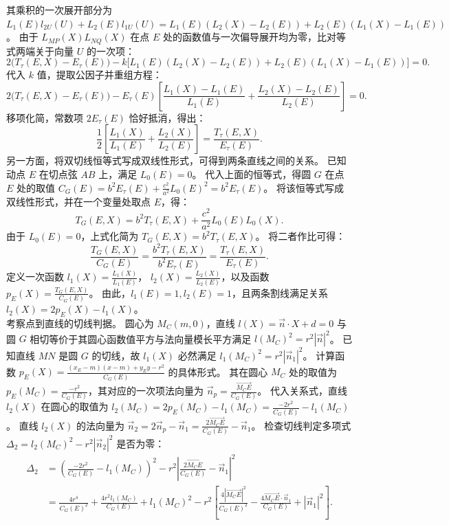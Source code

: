 \begin{solution}
其乘积的一次展开部分为 $L_1(E) l_{2U}(U) + L_2(E) l_{1U}(U) = L_1(E) (L_2(X) - L_2(E)) + L_2(E) (L_1(X) - L_1(E))$。
由于 $L_{MP}(X) L_{NQ}(X)$ 在点 $E$ 处的函数值与一次偏导展开均为零，比对等式两端关于向量 $U$ 的一次项：
\[ 2\big(T_\tau(E, X) - E_\tau(E)\big) - k \big[ L_1(E) (L_2(X) - L_2(E)) + L_2(E) (L_1(X) - L_1(E)) \big] = 0. \]
代入 $k$ 值，提取公因子并重组方程：
\[ 2\big(T_\tau(E, X) - E_\tau(E)\big) - E_\tau(E) \left[ \frac{L_1(X) - L_1(E)}{L_1(E)} + \frac{L_2(X) - L_2(E)}{L_2(E)} \right] = 0. \]
移项化简，常数项 $2E_\tau(E)$ 恰好抵消，得出：
\[ \frac{1}{2} \left[ \frac{L_1(X)}{L_1(E)} + \frac{L_2(X)}{L_2(E)} \right] = \frac{T_\tau(E, X)}{E_\tau(E)}. \]
另一方面，将双切线恒等式写成双线性形式，可得到两条直线之间的关系。
已知动点 $E$ 在切点弦 $AB$ 上，满足 $L_0(E) = 0$。
代入上面的恒等式，得圆 $G$ 在点 $E$ 处的取值 $C_G(E) = b^2 E_\tau(E) + \frac{c^2}{a^2}L_0(E)^2 = b^2 E_\tau(E)$。
将该恒等式写成双线性形式，并在一个变量处取点 $E$，得：
\[ T_G(E, X) = b^2 T_\tau(E, X) + \frac{c^2}{a^2} L_0(E) L_0(X). \]
由于 $L_0(E) = 0$，上式化简为 $T_G(E, X) = b^2 T_\tau(E, X)$。
将二者作比可得：
\[ \frac{T_G(E, X)}{C_G(E)} = \frac{b^2 T_\tau(E, X)}{b^2 E_\tau(E)} = \frac{T_\tau(E, X)}{E_\tau(E)}. \]
定义一次函数 $l_1(X) = \frac{L_1(X)}{L_1(E)}$， $l_2(X) = \frac{L_2(X)}{L_2(E)}$，以及函数 $p_E(X) = \frac{T_G(E, X)}{C_G(E)}$。
由此，$l_1(E) = 1, l_2(E) = 1$，且两条割线满足关系 $l_2(X) = 2p_E(X) - l_1(X)$。\\
考察点到直线的切线判据。
圆心为 $M_C(m, 0)$，直线 $l(X) = \vec{n} \cdot X + d = 0$ 与圆 $G$ 相切等价于其圆心函数值平方与法向量模长平方满足 $l(M_C)^2 = r^2 |\vec{n}|^2$。
已知直线 $MN$ 是圆 $G$ 的切线，故 $l_1(X)$ 必然满足 $l_1(M_C)^2 = r^2 |\vec{n}_1|^2$。
计算函数 $p_E(X) = \frac{(x_E - m)(x - m) + y_E y - r^2}{C_G(E)}$ 的具体形式。
其在圆心 $M_C$ 处的取值为 $p_E(M_C) = \frac{-r^2}{C_G(E)}$，其对应的一次项法向量为 $\vec{n}_p = \frac{\overrightarrow{M_C E}}{C_G(E)}$。
代入关系式，直线 $l_2(X)$ 在圆心的取值为 $l_2(M_C) = 2p_E(M_C) - l_1(M_C) = \frac{-2r^2}{C_G(E)} - l_1(M_C)$。
直线 $l_2(X)$ 的法向量为 $\vec{n}_2 = 2\vec{n}_p - \vec{n}_1 = \frac{2\overrightarrow{M_C E}}{C_G(E)} - \vec{n}_1$。
检查切线判定多项式 $\Delta_2 = l_2(M_C)^2 - r^2 |\vec{n}_2|^2$ 是否为零：
\begin{align*}
\Delta_2 &= \left( \frac{-2r^2}{C_G(E)} - l_1(M_C) \right)^2 - r^2 \left| \frac{2\overrightarrow{M_C E}}{C_G(E)} - \vec{n}_1 \right|^2 \\
&= \frac{4r^4}{C_G(E)^2} + \frac{4r^2 l_1(M_C)}{C_G(E)} + l_1(M_C)^2 - r^2 \left[ \frac{4|\overrightarrow{M_C E}|^2}{C_G(E)^2} - \frac{4\overrightarrow{M_C E} \cdot \vec{n}_1}{C_G(E)} + |\vec{n}_1|^2 \right].

\end{align*}
\end{solution}
